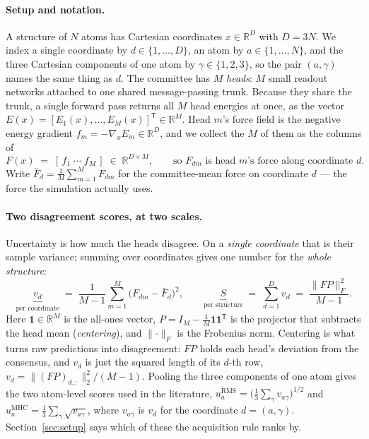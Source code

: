 \documentclass{article}
\begin{document}
\paragraph{Setup and notation.}
A structure of $N$ atoms has Cartesian coordinates $x\in\mathbb{R}^{D}$ with $D=3N$. We index a
single coordinate by $d\in\{1,\dots,D\}$, an atom by $a\in\{1,\dots,N\}$, and the three Cartesian
components of one atom by $\gamma\in\{1,2,3\}$, so the pair $(a,\gamma)$ names the same thing as $d$.
The committee has $M$ \emph{heads}: $M$ small readout networks attached to one shared
message-passing trunk. Because they share the trunk, a single forward pass returns all $M$ head
energies at once, as the vector
$E(x)=[E_1(x),\dots,E_M(x)]^{\mathsf T}\in\mathbb{R}^{M}$. Head $m$'s force field is the negative
energy gradient $f_m=-\nabla_x E_m\in\mathbb{R}^{D}$, and we collect the $M$ of them as the columns
of
\begin{equation*}
F(x)\;=\;[\,f_1\;\cdots\;f_M\,]\;\in\;\mathbb{R}^{D\times M},
\qquad\text{so } F_{dm} \text{ is head } m\text{'s force along coordinate } d .
\end{equation*}
Write $\bar F_d=\tfrac1M\sum_{m=1}^{M}F_{dm}$ for the committee-mean force on coordinate $d$ --- the
force the simulation actually uses.

\paragraph{Two disagreement scores, at two scales.}
Uncertainty is how much the heads disagree. On a \emph{single coordinate} that is their sample
variance; summing over coordinates gives one number for the \emph{whole structure}:
\begin{equation}
\underbrace{v_d}_{\text{per coordinate}}\;=\;\frac{1}{M-1}\sum_{m=1}^{M}\bigl(F_{dm}-\bar F_d\bigr)^2 ,
\qquad
\underbrace{S}_{\text{per structure}}\;=\;\sum_{d=1}^{D} v_d\;=\;\frac{\lVert FP\rVert_F^2}{M-1} .
\end{equation}
Here $\mathbf 1\in\mathbb{R}^{M}$ is the all-ones vector,
$P=I_M-\tfrac{1}{M}\mathbf 1\mathbf 1^{\mathsf T}$ is the projector that subtracts the head mean
(\emph{centering}), and $\lVert\cdot\rVert_F$ is the Frobenius norm. Centering is what turns raw
predictions into disagreement: $FP$ holds each head's deviation from the consensus, and $v_d$ is
just the squared length of its $d$-th row, $v_d=\lVert (FP)_{d,:}\rVert_2^2/(M-1)$. Pooling the
three components of one atom gives the two atom-level scores used in the literature,
$u_a^{\mathrm{RMS}}=\bigl(\tfrac13\sum_{\gamma}v_{a\gamma}\bigr)^{1/2}$ and
$u_a^{\mathrm{MHC}}=\tfrac13\sum_{\gamma}\sqrt{v_{a\gamma}}$, where $v_{a\gamma}$ is $v_d$ for the
coordinate $d=(a,\gamma)$. Section~\ref{sec:setup} says which of these the acquisition rule ranks by.
\end{document}
